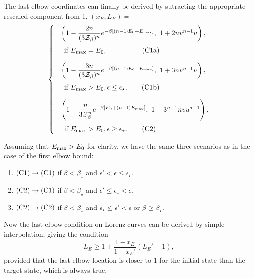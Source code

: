 \documentclass[pra,
aps,
twocolumn,
superscriptaddress,
groupedaddress,
nofootinbib,
reprint
]{revtex4-1}
\begin{document}
The last elbow coordinates can finally be derived by sutracting the appropriate rescaled component from 1, $(x_E, L_E) =$
\begin{equation}\label{eq:last_elb_coords}
	\begin{cases}
		&\left( 1-\dfrac{2n}{(3\Z_\beta)^n}e^{-\beta [(n-1)E_0 + E_{\rm{max}}]},\ 1 + 2n v^{n-1} u \right), \vspace{5pt}\\
		&\hspace{5pt} \text{if } E_{\rm{max}} = E_0, \hspace{51pt}\rm{(C1a)} \vspace{10pt}\\
		&\left( 1-\dfrac{3n}{(3\Z_\beta)^n}e^{-\beta [(n-1)E_0 + E_{\rm{max}}]},\ 1 + 3n v^{n-1} u \right), \vspace{5pt}\\
		&\hspace{5pt} \text{if } E_{\rm{max}} > E_0, \epsilon \leq \epsilon_{\star}, \hspace{20pt}\rm{(C1b)} \vspace{10pt}\\
		&\left( 1-\dfrac{n}{3\Z_\beta^n}e^{-\beta [E_0 + (n-1)E_{\rm{max}}]},\ 1 + 3^{n-1}n v u^{n-1} \right), \vspace{5pt}\\
		&\hspace{5pt} \text{if } E_{\rm{max}} > E_0, \epsilon \geq \epsilon_{\star}. \hspace{22pt}\rm{(C2)}
	\end{cases}
\end{equation}

Assuming that $E_{\rm{max}} > E_0$ for clarity, we have the same three scenarios as in the case of the first elbow bound:
\begin{enumerate}
	\item $\rm{(C1)} \rightarrow \rm{(C1)}$ if $\beta < \beta_{\star}$ and $\epsilon' < \epsilon  \leq \epsilon_{\star}$.
	\item $\rm{(C2)} \rightarrow \rm{(C1)}$ if $\beta < \beta_{\star}$ and $\epsilon' \leq \epsilon_{\star} < \epsilon$.
	\item $\rm{(C2)} \rightarrow \rm{(C2)}$ if $\beta < \beta_{\star}$ and $\epsilon_{\star} \leq \epsilon' < \epsilon$ or $\beta \geq \beta_{\star}$.
\end{enumerate}
Now the last elbow condition on Lorenz curves can be derived by simple interpolation, giving the condition
\begin{equation}
	L_E \geq 1 + \frac{1-x_E}{1-x_E'} (L_E' - 1),
\end{equation}
provided that the last elbow location is closer to 1 for the initial state than the target state, which is always true.
\end{document}
